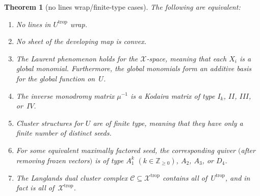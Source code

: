 \documentclass[11pt]{article}
\numberwithin{equation}{section}
\numberwithin{figure}{section}
\numberwithin{table}{section}
\DeclareMathOperator{\trop}{trop}
\let\bb=\mathbb
\let\s=\mathcal
\newtheorem{thm}{Theorem}[section]
\theoremstyle{definition}
\begin{document}
\begin{thm}[no lines wrap/finite-type cases]\label{no-wrap}
The following are equivalent:
\begin{enumerate}\itemsep=0pt
\item[$1.$] No {lines} in $U^{\trop}$ wrap.
\item[$2.$] No sheet of the {developing map} is convex.
\item[$3.$] The Laurent phenomenon holds for the $\s{X}$-space, meaning that each $X_i$ is a global monomial. Furthermore, the {global monomials} form an additive basis for the global function on~$U$.
\item[$4.$] The inverse {monodromy} matrix $\mu^{-1}$ is a Kodaira matrix of type $I_k$, $II$, $III$, or~$IV$.
\item[$5.$] Cluster structures for $U$ are of {finite type}, meaning that they have only a finite number of distinct seeds.
\item[$6.$] For some equivalent maximally factored seed, the corresponding quiver $($after removing frozen vectors$)$ is of type $A_1^k$ $(k\in \bb{Z}_{\geq 0})$, $A_2$, $A_3$, or $D_4$.
\item[$7.$] The Langlands dual {cluster complex} $\s{C}\subseteq \s{X}^{\trop}$ contains all of~$U^{\trop}$, and in fact is all of~$\s{X}^{\trop}$.
\end{enumerate}
\end{thm}
\end{document}
